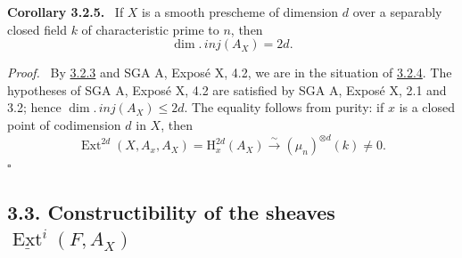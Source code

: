 \documentclass[11pt]{article}
\providecommand{\Hh}{\mathrm{H}}
\providecommand{\uExt}{\underline{\Ext}}
\providecommand{\qedtext}{\hfill$\square$}
\newenvironment{statement}[1]{\par\medskip\noindent\textbf{#1.}\ }{\par\medskip}
\newenvironment{prooftext}[1][Proof]{\par\noindent\emph{#1.}\ }{\par\medskip}
\DeclareMathOperator{\Ext}{Ext}
\providecommand{\qedtext}{\hfill$\square$}
\begin{document}
\label{sga5:I:corollary:3.2.5}\begin{statement}{Corollary 3.2.5}
If $X$ is a smooth prescheme of dimension $d$ over a separably closed field $k$ of characteristic prime to $n$, then
\[
   \dim.\,inj(A_X)=2d.
\]
\end{statement}

\begin{prooftext}
By \hyperref[sga5:I:corollary:3.2.3]{3.2.3} and SGA A, Exposé X, 4.2, we are in the situation of \hyperref[sga5:I:lemma:3.2.4]{3.2.4}. The hypotheses of SGA A, Exposé X, 4.2 are satisfied by SGA A, Exposé X, 2.1 and 3.2; hence $\dim.\,inj(A_X)\le2d$. The equality follows from purity: if $x$ is a closed point of codimension $d$ in $X$, then
\[
   \Ext^{2d}(X,A_x,A_X)=\Hh^{2d}_x(A_X)
      \xrightarrow{\sim}(\mu_n)^{\otimes d}(k)\ne0.
\]
\qedtext
\end{prooftext}

\subsection*{3.3. Constructibility of the sheaves $\uExt^i(F,A_X)$}\label{sga5:I:subsection:3.3}
\end{document}
